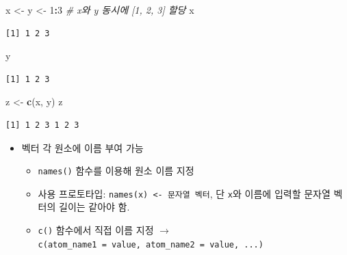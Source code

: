\documentclass[
  11pt,
]{krantz}
\newenvironment{Shaded}{\begin{snugshade}}{\end{snugshade}}
\newcommand{\CommentTok}[1]{\textcolor[rgb]{0.37,0.37,0.37}{\textit{#1}}}
\newcommand{\DecValTok}[1]{\textcolor[rgb]{0.06,0.06,0.06}{#1}}
\newcommand{\KeywordTok}[1]{\textcolor[rgb]{0.27,0.27,0.27}{\textbf{#1}}}
\newcommand{\NormalTok}[1]{#1}
\newcommand{\OperatorTok}[1]{\textcolor[rgb]{0.43,0.43,0.43}{\textbf{#1}}}
\newcommand{\StringTok}[1]{\textcolor[rgb]{0.5,0.5,0.5}{#1}}
\providecommand{\tightlist}{%
  \setlength{\itemsep}{0pt}\setlength{\parskip}{0pt}}
\begin{document}
\footnotesize

\begin{Shaded}
\begin{Highlighting}[]
\NormalTok{x <-}\StringTok{ }\NormalTok{y <-}\StringTok{ }\DecValTok{1}\OperatorTok{:}\DecValTok{3} \CommentTok{# x와 y 동시에 [1, 2, 3] 할당}
\NormalTok{x }
\end{Highlighting}
\end{Shaded}

\begin{verbatim}
[1] 1 2 3
\end{verbatim}

\begin{Shaded}
\begin{Highlighting}[]
\NormalTok{y}
\end{Highlighting}
\end{Shaded}

\begin{verbatim}
[1] 1 2 3
\end{verbatim}

\begin{Shaded}
\begin{Highlighting}[]
\NormalTok{z <-}\StringTok{ }\KeywordTok{c}\NormalTok{(x, y)}
\NormalTok{z}
\end{Highlighting}
\end{Shaded}

\begin{verbatim}
[1] 1 2 3 1 2 3
\end{verbatim}

\normalsize

\begin{itemize}
\tightlist
\item
  벡터 각 원소에 이름 부여 가능

  \begin{itemize}
  \tightlist
  \item
    \texttt{names()} 함수를 이용해 원소 이름 지정
  \item
    사용 프로토타입: \texttt{names(x)\ \textless{}-\ 문자열\ 벡터}, 단 \texttt{x}와 이름에 입력할 문자열 벡터의 길이는 같아야 함.
  \item
    \texttt{c()} 함수에서 직접 이름 지정 \(\rightarrow\) \texttt{c(atom\_name1\ =\ value,\ atom\_name2\ =\ value,\ ...)}
  \end{itemize}
\end{itemize}

\footnotesize
\end{document}
